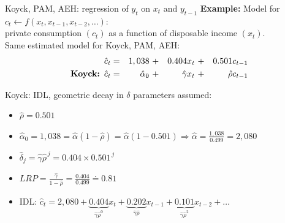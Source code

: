 \documentclass{beamer}
\begin{document}
\begin{frame}{Koyck, PAM, AEH: regression of $y_t$ on $x_t$ and $y_{t-1}$}
\textbf{Example:} Model for $c_t \leftarrow f(x_t,x_{t-1},x_{t-2},\dots)$:\\
private consumption $(c_t)$ as a function of disposable income $(x_t)$.\\
Same estimated model for Koyck, PAM, AEH:
\begin{equation*}
\begin{aligned}
\hat{c}_t & = &1,038~&+ &0.404 x_t~ &+ &0.501 c_{t-1} \\
\textnormal{\textbf{Koyck:}} \,\,\, \hat{c}_t & = &\hat{\alpha}_0~&+ &\hat{\gamma} x_t~ &+ &\hat{\rho} c_{t-1} 
\end{aligned}
\end{equation*}

Koyck: IDL, geometric decay in $\delta$ parameters assumed:
\begin{itemize}
\item $\hat{\rho}=0.501$
\smallskip
\item $\hat{\alpha}_0 = 1,038 = \hat{\alpha}(1-\hat{\rho}) = \hat{\alpha}(1-0.501) 
\Rightarrow \hat{\alpha}= \frac{1,038}{0.499}=2,080$
\item $\hat{\delta}_j = \hat{\gamma} \hat{\rho}^{\,j}=0.404 \times 0.501^{\,j}$
\smallskip
\item $\textit{LRP}=\frac{\hat{\gamma}}{1-\hat{\rho}}= \frac{0.404}{0.499} \doteq 0.81 $
\smallskip
\item IDL: $\hat{c}_t = 2,080 + \underbrace{0.404}_{\hat{\gamma} \hat{\rho}^{0}} x_t + \underbrace{0.202}_{\hat{\gamma} \hat{\rho}} x_{t-1} 
+ \underbrace{0.101}_{\hat{\gamma} \hat{\rho}^{2}} x_{t-2} + \dots$
\end{itemize}
\end{frame}

\end{document}
